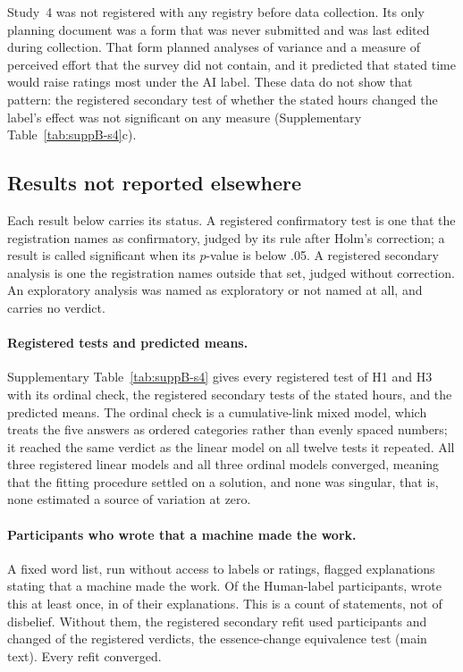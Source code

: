 Study~4 was not registered with any registry before data collection. Its only planning document was a form that was never submitted and was last edited during collection. That form planned analyses of variance and a measure of perceived effort that the survey did not contain, and it predicted that stated time would raise ratings most under the AI label. These data do not show that pattern: the registered secondary test of whether the stated hours changed the label's effect was not significant on any measure (Supplementary Table~\ref{tab:suppB-s4}c).

\subsection*{Results not reported elsewhere}

Each result below carries its status. A registered confirmatory test is one that the registration names as confirmatory, judged by its rule after Holm's correction; a result is called significant when its $p$-value is below .05. A registered secondary analysis is one the registration names outside that set, judged without correction. An exploratory analysis was named as exploratory or not named at all, and carries no verdict.

\paragraph*{Registered tests and predicted means.}
Supplementary Table~\ref{tab:suppB-s4} gives every registered test of H1 and H3 with its ordinal check, the registered secondary tests of the stated hours, and the predicted means. The ordinal check is a cumulative-link mixed model, which treats the five answers as ordered categories rather than evenly spaced numbers; it reached the same verdict as the linear model on all twelve tests it repeated. All three registered linear models and all three ordinal models converged, meaning that the fitting procedure settled on a solution, and none was singular, that is, none estimated a source of variation at zero.



\paragraph*{Participants who wrote that a machine made the work.}
A fixed word list, run without access to labels or ratings, flagged explanations stating that a machine made the work. Of the \SFourMachineMadeNHuman{} Human-label participants, \SFourMachineMadeN{} wrote this at least once, in \SFourMachineMadeResponses{} of their \SFourMachineMadeNResponses{} explanations. This is a count of statements, not of disbelief. Without them, the registered secondary refit used \SFourNRefit{} participants and changed \SFourNRefitVerdictsChanged{} of the \SFourNRefitVerdicts{} registered verdicts, the essence-change equivalence test (main text). Every refit converged.

